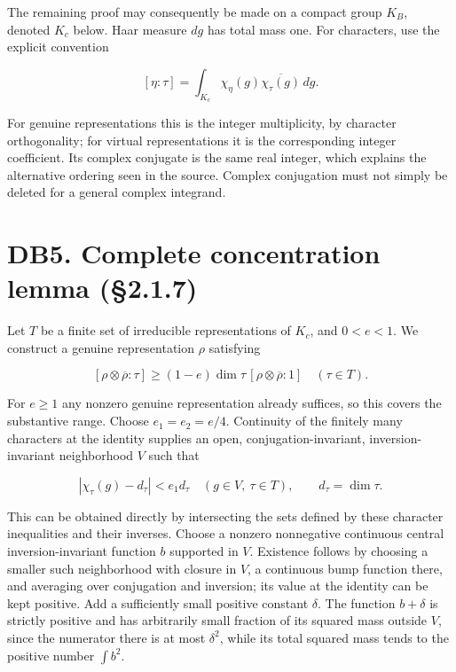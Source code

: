 \documentclass[
]{report}
\begin{document}
The remaining proof may consequently be made on a compact group \(K_B\),
denoted \(K_c\) below. Haar measure \(dg\) has total mass one. For
characters, use the explicit convention

\[
 [\eta:\tau]=\int_{K_c}\chi_\eta(g)\overline{\chi_\tau(g)}\,dg.
 \tag{DB4.1}
\]

For genuine representations this is the integer multiplicity, by
character orthogonality; for virtual representations it is the
corresponding integer coefficient. Its complex conjugate is the same
real integer, which explains the alternative ordering seen in the
source. Complex conjugation must not simply be deleted for a general
complex integrand.

\section{DB5. Complete concentration lemma
(§2.1.7)}\label{db5.-complete-concentration-lemma-2.1.7}

Let \(T\) be a finite set of irreducible representations of \(K_c\), and
\(0<e<1\). We construct a genuine representation \(\rho\) satisfying

\[
 [\rho\otimes\overline\rho:\tau]
 \geq(1-e)\dim\tau\,[\rho\otimes\overline\rho:1]
 \quad(\tau\in T).
 \tag{DB5.1}
\]

For \(e\geq1\) any nonzero genuine representation already suffices, so
this covers the substantive range. Choose \(e_1=e_2=e/4\). Continuity of
the finitely many characters at the identity supplies an open,
conjugation-invariant, inversion-invariant neighborhood \(V\) such that

\[
 |\chi_\tau(g)-d_\tau|<e_1d_\tau
 \quad(g\in V,\ \tau\in T),\qquad d_\tau=\dim\tau.
 \tag{DB5.2}
\]

This can be obtained directly by intersecting the sets defined by these
character inequalities and their inverses. Choose a nonzero nonnegative
continuous central inversion-invariant function \(b\) supported in
\(V\). Existence follows by choosing a smaller such neighborhood with
closure in \(V\), a continuous bump function there, and averaging over
conjugation and inversion; its value at the identity can be kept
positive. Add a sufficiently small positive constant \(\delta\). The
function \(b+\delta\) is strictly positive and has arbitrarily small
fraction of its squared mass outside \(V\), since the numerator there is
at most \(\delta^2\), while its total squared mass tends to the positive
number \(\int b^2\).
\end{document}
